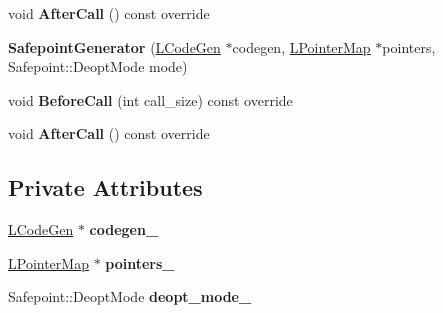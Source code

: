 \begin{DoxyCompactItemize}
\item 
void {\bfseries After\+Call} () const  override\hypertarget{classv8_1_1internal_1_1_safepoint_generator_a32145b74058d317a4b7a01e894c17df8}{}\label{classv8_1_1internal_1_1_safepoint_generator_a32145b74058d317a4b7a01e894c17df8}

\item 
{\bfseries Safepoint\+Generator} (\hyperlink{classv8_1_1internal_1_1_l_code_gen}{L\+Code\+Gen} $\ast$codegen, \hyperlink{classv8_1_1internal_1_1_l_pointer_map}{L\+Pointer\+Map} $\ast$pointers, Safepoint\+::\+Deopt\+Mode mode)\hypertarget{classv8_1_1internal_1_1_safepoint_generator_a7a81102e43adaf0a004c32f46d708577}{}\label{classv8_1_1internal_1_1_safepoint_generator_a7a81102e43adaf0a004c32f46d708577}

\item 
void {\bfseries Before\+Call} (int call\+\_\+size) const  override\hypertarget{classv8_1_1internal_1_1_safepoint_generator_a7b03e6da476c179ce443391b5bd938c3}{}\label{classv8_1_1internal_1_1_safepoint_generator_a7b03e6da476c179ce443391b5bd938c3}

\item 
void {\bfseries After\+Call} () const  override\hypertarget{classv8_1_1internal_1_1_safepoint_generator_a32145b74058d317a4b7a01e894c17df8}{}\label{classv8_1_1internal_1_1_safepoint_generator_a32145b74058d317a4b7a01e894c17df8}

\end{DoxyCompactItemize}
\subsection*{Private Attributes}
\begin{DoxyCompactItemize}
\item 
\hyperlink{classv8_1_1internal_1_1_l_code_gen}{L\+Code\+Gen} $\ast$ {\bfseries codegen\+\_\+}\hypertarget{classv8_1_1internal_1_1_safepoint_generator_af0ae7449067863b39b8d564e457f6f66}{}\label{classv8_1_1internal_1_1_safepoint_generator_af0ae7449067863b39b8d564e457f6f66}

\item 
\hyperlink{classv8_1_1internal_1_1_l_pointer_map}{L\+Pointer\+Map} $\ast$ {\bfseries pointers\+\_\+}\hypertarget{classv8_1_1internal_1_1_safepoint_generator_afa769046cd4b3584681dde3e17316871}{}\label{classv8_1_1internal_1_1_safepoint_generator_afa769046cd4b3584681dde3e17316871}

\item 
Safepoint\+::\+Deopt\+Mode {\bfseries deopt\+\_\+mode\+\_\+}\hypertarget{classv8_1_1internal_1_1_safepoint_generator_a1aeddc330dddfacf7988c8739a6e3df0}{}\label{classv8_1_1internal_1_1_safepoint_generator_a1aeddc330dddfacf7988c8739a6e3df0}

\end{DoxyCompactItemize}


